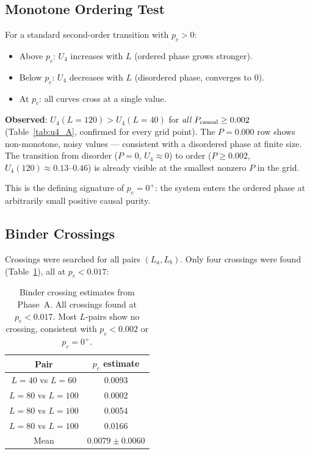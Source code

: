 \documentclass[12pt,a4paper]{article}
\begin{document}
\subsection{Monotone Ordering Test}

For a standard second-order transition with $p_c > 0$:
\begin{itemize}
  \item Above $p_c$: $U_4$ increases with $L$ (ordered phase grows stronger).
  \item Below $p_c$: $U_4$ decreases with $L$ (disordered phase, converges to 0).
  \item At $p_c$: all curves cross at a single value.
\end{itemize}

\textbf{Observed}: $U_4(L=120) > U_4(L=40)$ for \emph{all}
$P_{\rm causal} \geq 0.002$ (Table~\ref{tab:u4_A}, confirmed for every grid point).
The $P=0.000$ row shows non-monotone, noisy values --- consistent with a
disordered phase at finite size.
The transition from disorder ($P=0$, $U_4 \approx 0$) to order
($P \geq 0.002$, $U_4(120) \approx 0.13$--$0.46$) is already visible
at the smallest nonzero $P$ in the grid.

This is the defining signature of $p_c = 0^+$: the system enters the
ordered phase at arbitrarily small positive causal purity.

\subsection{Binder Crossings}

Crossings were searched for all pairs $(L_a, L_b)$.
Only four crossings were found (Table~\ref{tab:crossings}),
all at $p_c < 0.017$:

\begin{table}[h]
\centering
\caption{Binder crossing estimates from Phase~A.
All crossings found at $p_c < 0.017$.
Most $L$-pairs show no crossing, consistent with $p_c < 0.002$ or $p_c = 0^+$.}
\label{tab:crossings}
\begin{tabular}{cc}
\toprule
Pair & $p_c$ estimate \\
\midrule
$L=40$ vs $L=60$   & 0.0093 \\
$L=80$ vs $L=100$  & 0.0002 \\
$L=80$ vs $L=100$  & 0.0054 \\
$L=80$ vs $L=100$  & 0.0166 \\
\midrule
Mean & $0.0079 \pm 0.0060$ \\
\bottomrule
\end{tabular}
\end{table}
\end{document}
